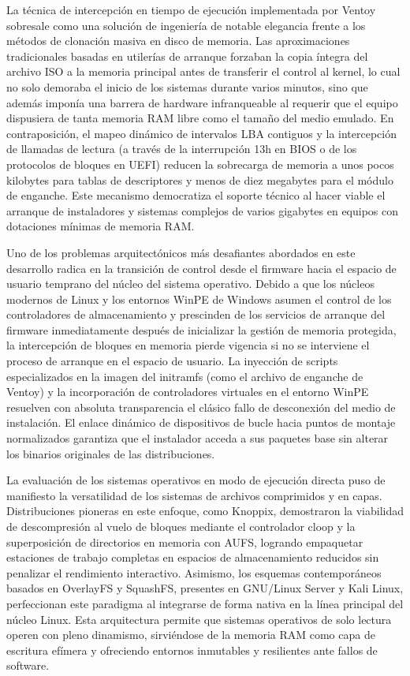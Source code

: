 \documentclass[12pt]{article}
\begin{document}
La técnica de intercepción en tiempo de ejecución implementada por Ventoy sobresale como una solución de ingeniería de notable elegancia frente a los métodos de clonación masiva en disco de memoria. Las aproximaciones tradicionales basadas en utilerías de arranque forzaban la copia íntegra del archivo ISO a la memoria principal antes de transferir el control al kernel, lo cual no solo demoraba el inicio de los sistemas durante varios minutos, sino que además imponía una barrera de hardware infranqueable al requerir que el equipo dispusiera de tanta memoria RAM libre como el tamaño del medio emulado. En contraposición, el mapeo dinámico de intervalos LBA contiguos y la intercepción de llamadas de lectura (a través de la interrupción 13h en BIOS o de los protocolos de bloques en UEFI) reducen la sobrecarga de memoria a unos pocos kilobytes para tablas de descriptores y menos de diez megabytes para el módulo de enganche. Este mecanismo democratiza el soporte técnico al hacer viable el arranque de instaladores y sistemas complejos de varios gigabytes en equipos con dotaciones mínimas de memoria RAM.

Uno de los problemas arquitectónicos más desafiantes abordados en este desarrollo radica en la transición de control desde el firmware hacia el espacio de usuario temprano del núcleo del sistema operativo. Debido a que los núcleos modernos de Linux y los entornos WinPE de Windows asumen el control de los controladores de almacenamiento y prescinden de los servicios de arranque del firmware inmediatamente después de inicializar la gestión de memoria protegida, la intercepción de bloques en memoria pierde vigencia si no se interviene el proceso de arranque en el espacio de usuario. La inyección de scripts especializados en la imagen del initramfs (como el archivo de enganche de Ventoy) y la incorporación de controladores virtuales en el entorno WinPE resuelven con absoluta transparencia el clásico fallo de desconexión del medio de instalación. El enlace dinámico de dispositivos de bucle hacia puntos de montaje normalizados garantiza que el instalador acceda a sus paquetes base sin alterar los binarios originales de las distribuciones.

La evaluación de los sistemas operativos en modo de ejecución directa puso de manifiesto la versatilidad de los sistemas de archivos comprimidos y en capas. Distribuciones pioneras en este enfoque, como Knoppix, demostraron la viabilidad de descompresión al vuelo de bloques mediante el controlador cloop y la superposición de directorios en memoria con AUFS, logrando empaquetar estaciones de trabajo completas en espacios de almacenamiento reducidos sin penalizar el rendimiento interactivo. Asimismo, los esquemas contemporáneos basados en OverlayFS y SquashFS, presentes en GNU/Linux Server y Kali Linux, perfeccionan este paradigma al integrarse de forma nativa en la línea principal del núcleo Linux. Esta arquitectura permite que sistemas operativos de solo lectura operen con pleno dinamismo, sirviéndose de la memoria RAM como capa de escritura efímera y ofreciendo entornos inmutables y resilientes ante fallos de software.
\end{document}
